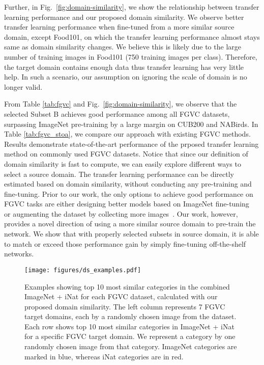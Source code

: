 \documentclass[10pt,twocolumn,letterpaper]{article}
\begin{document}
Further, in Fig.\ \ref{fig:domain-similarity}, we show the relationship between transfer learning performance and our proposed domain similarity.
We observe better transfer learning performance when fine-tuned from a more similar source domain, except Food101, on which the transfer learning performance almost stays same as domain similarity changes.
We believe this is likely due to the large number of training images in Food101 (750 training images per class).
Therefore, the target domain contains enough data thus transfer learning has very little help.
In such a scenario, our assumption on ignoring the scale of domain is no longer valid.

From Table \ref{tab:fgvc} and Fig.\ \ref{fig:domain-similarity}, we observe that the selected Subset B achieves good performance among all FGVC datasets, surpassing ImageNet pre-training by a large margin on CUB200 and NABirds.
In Table \ref{tab:fgvc_stoa}, we compare our approach with existing FGVC methods.
Results demonstrate state-of-the-art performance of the prposed transfer learning method on commonly used FGVC datasets.
Notice that since our definition of domain similarity is fast to compute, we can easily explore different ways to select a source domain.
The transfer learning performance can be directly estimated based on domain similarity, without conducting any pre-training and fine-tuning.
Prior to our work, the only options to achieve good performance on FGVC tasks are either designing better models based on ImageNet fine-tuning~\cite{bilinearcnn, kernel_pooling, multi-attention_fgvc} or augmenting the dataset by collecting more images~\cite{xu2016webly, krause2016unreasonable}.
Our work, however, provides a novel direction of using a more similar source domain to pre-train the network.
We show that with properly selected subsets in source domain, it is able to match or exceed those performance gain by simply fine-tuning off-the-shelf networks.






\begin{figure*}[t!]
\begin{center}
\texttt{[image: figures/ds\_examples.pdf]}
\end{center}
\caption{Examples showing top 10 most similar categories in the combined ImageNet + iNat for each FGVC dataset, calculated with our proposed domain similarity. The left column represents 7 FGVC target domains, each by a randomly chosen image from the dataset. Each row shows top 10 most similar categories in ImageNet + iNat for a specific FGVC target domain. We represent a category by one randomly chosen image from that category. ImageNet categories are marked in blue, whereas iNat categories are in red.}
\label{fig:ds_examples}
\end{figure*}
\end{document}
